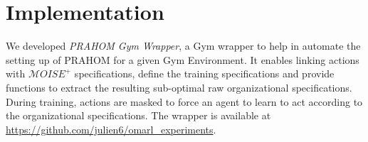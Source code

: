 \documentclass[runningheads]{llncs}
\begin{document}
\section{Implementation}

We developed \emph{PRAHOM Gym Wrapper}\label{gym-wrapper}, a Gym wrapper to help in automate the setting up of PRAHOM for a given Gym Environment. It enables linking actions with $\mathcal{M}OISE^+$ specifications, define the training specifications and provide functions to extract the resulting sub-optimal raw organizational specifications. During training, actions are masked to force an agent to learn to act according to the organizational specifications. The wrapper is available at \url{https://github.com/julien6/omarl_experiments}.







\end{document}
